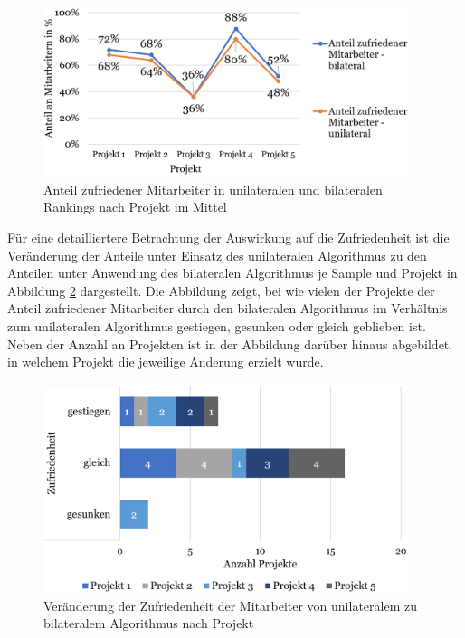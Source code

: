 \begin{figure}[H]
    \centering
	\includegraphics[width=0.95\textwidth]{gfx/verhaeltnis-z-durchschnitt-projekte.png}
	\caption[Anteil zufriedener Mitarbeiter in unilateralen und bilateralen Rankings nach Projekt im Mittel]{Anteil zufriedener Mitarbeiter in unilateralen und bilateralen Rankings nach Projekt im Mittel}
	\label{fig:ergebnisse:abb8}
\end{figure}

Für eine detailliertere Betrachtung der Auswirkung auf die Zufriedenheit ist die Veränderung der Anteile unter Einsatz des unilateralen Algorithmus zu den Anteilen unter Anwendung des bilateralen Algorithmus je Sample und Projekt in Abbildung \ref{fig:ergebnisse:abb9} dargestellt.
Die Abbildung zeigt, bei wie vielen der Projekte der Anteil zufriedener Mitarbeiter durch den bilateralen Algorithmus im Verhältnis zum unilateralen Algorithmus gestiegen, gesunken oder gleich geblieben ist.
Neben der Anzahl an Projekten ist in der Abbildung darüber hinaus abgebildet, in welchem Projekt die jeweilige Änderung erzielt wurde.

\begin{figure}
    \centering
	\includegraphics[width=0.95\textwidth]{gfx/verhaeltnis-z-projekte.png}
	\caption[Veränderung der Zufriedenheit der Mitarbeiter von unilateralem zu bilateralem Algorithmus nach Projekt]{Veränderung der Zufriedenheit der Mitarbeiter von unilateralem zu bilateralem Algorithmus nach Projekt}
	\label{fig:ergebnisse:abb9}
\end{figure}

